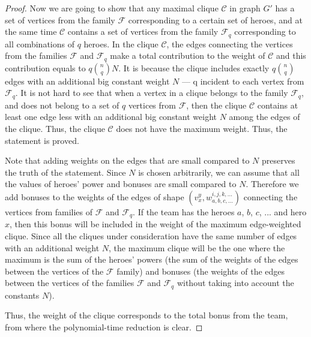 \documentclass[smallextended]{svjour3}       %
\begin{document}
\begin{proof}
     Now we are going to show that any maximal clique $\mathcal{C}$ in graph $G'$ has a set of vertices from the family $\mathcal{F}$ corresponding to a certain set of heroes, and at the same time $\mathcal{C}$ contains a set of vertices from the family $ \mathcal{F}_q $ corresponding to all combinations of $q$ heroes. In the clique $\mathcal{C}$, the edges connecting the vertices from the families $ \mathcal{F} $ and $ \mathcal{F}_q $ make a total contribution to the weight of $\mathcal{C}$ and this contribution equals to $ q \binom{n}{q} N $. It is because the clique includes exactly $ q \binom{n}{q} $ edges with an additional big constant weight $N$ --- q incident to each vertex from $ \mathcal {F}_q $.  It is not hard to see that when a vertex in a clique belongs to the family $ \mathcal{F}_q $, and does not belong to a set of $q$ vertices from $ \mathcal {F} $, then the clique $\mathcal{C}$ contains at least one edge less with an additional big constant weight $ N $ among the edges of the clique. Thus, the clique $\mathcal{C}$ does not have the maximum weight. Thus, the statement is proved. 
    
    Note that adding weights on the edges that are small compared to $N$ preserves the truth of the statement. Since $N$ is chosen arbitrarily, we can assume that all the values of heroes’ power and bonuses are small compared to $N$.
	Therefore we add bonuses to the weights of the edges of shape $ (v_x^{y}, w_{a, b, c, ...} ^ {i, j, k, ...}) $ connecting the vertices from families of $\mathcal{F} $ and $ \mathcal{F}_q $. If the team has the heroes $a$, $b$, $c$, ... and hero $x$, then this bonus will be included in the weight of the maximum edge-weighted clique. Since all the cliques under consideration have the same number of edges with an additional weight $N$, the maximum clique will be the one where the maximum is the sum of the heroes' powers (the sum of the weights of the edges between the vertices of the $ \mathcal{F} $ family) and bonuses (the weights of the edges between the vertices of the families $ \mathcal{F} $ and $ \mathcal {F}_q $ without taking into account the constants $ N $).
    
Thus, the weight of the clique corresponds to the total bonus from the team, from where the polynomial-time reduction is clear.
    
\end{proof}

\end{document}
